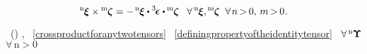 \nopagebreak\vspace{-0.2em}\begin{equation}\label{crossproductforanytwotensors}
{^\mathrm{n}\hspace{-0.12ex}\bm{\xi}} \times \hspace{-0.12ex} {^\mathrm{m}\hspace{-0.12ex}\bm{\zeta}}
=
- \hspace{.25ex} {^\mathrm{n}\hspace{-0.12ex}\bm{\xi}} \dotp \permutationsparitytensor \dotp \hspace{-0.1ex} {^\mathrm{m}\hspace{-0.12ex}\bm{\zeta}}
\;\;\:
%
\forall \hspace{.4ex} {^\mathrm{n}\hspace{-0.12ex}\bm{\xi}} ,
\hspace{-0.12ex} {^\mathrm{m}\hspace{-0.12ex}\bm{\zeta}}
\;\;
\forall \hspace{.25ex} n \hspace{-0.25ex} > \hspace{-0.25ex} 0 , \,
m \hspace{-0.25ex} > \hspace{-0.25ex} 0
\hspace{.1ex} .
\end{equation}

\vspace{-0.1em}\noindent
{}\ru{\:---}
~() ,
~\eqref{crossproductforanytwotensors}
~\eqref{definingpropertyoftheidentitytensor}
~${\forall \, {^\mathrm{n}\hspace{-0.12ex}\bm{\Upsilon}}}$ ${\forall \,\mathrm{n \!>\! 0}}$

